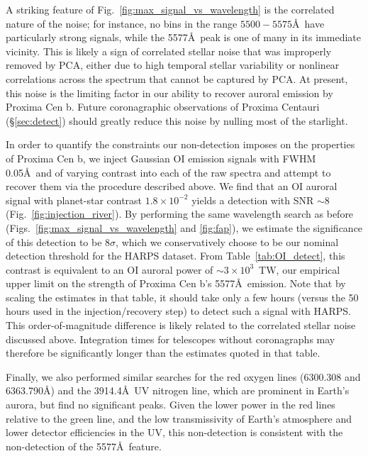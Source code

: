 \documentclass{emulateapj}
\begin{document}
A striking feature of Fig.~\ref{fig:max_signal_vs_wavelength} is the correlated nature of the noise; for instance, no bins in the range $5500 - 5575$\AA\ have particularly strong signals, while the 5577\AA\ peak is one of many in its immediate vicinity. This is likely a sign of correlated stellar noise that was improperly removed by PCA, either due to high temporal stellar variability or nonlinear correlations across the spectrum that cannot be captured by PCA. At present, this noise is the limiting factor in our ability to recover auroral emission by Proxima Cen b. Future coronagraphic observations of Proxima Centauri (\S\ref{sec:detect}) should greatly reduce this noise by nulling most of the starlight.

In order to quantify the constraints our non-detection imposes on the properties of Proxima Cen b, we inject Gaussian OI emission signals with FWHM 0.05\AA\ and of varying contrast into each of the raw spectra and attempt to recover them via the procedure described above. We find that an OI auroral signal with planet-star contrast $1.8\times 10^{-2}$ yields a detection with SNR ${\sim} 8$ (Fig.~\ref{fig:injection_river}). By performing the same wavelength search as before (Figs.~\ref{fig:max_signal_vs_wavelength} and \ref{fig:fap}), we estimate the significance of this detection to be $8\sigma$, which we conservatively choose to be our nominal detection threshold for the HARPS dataset. From Table~\ref{tab:OI_detect}, this contrast is equivalent to an OI auroral power of ${\sim} 3\times 10^{3}$~TW, our empirical upper limit on the strength of Proxima Cen b's 5577\AA\ emission. Note that by scaling the estimates in that table, it should take only a few hours (versus the 50 hours used in the injection/recovery step) to detect such a signal with HARPS. This order-of-magnitude difference is likely related to the correlated stellar noise discussed above. Integration times for telescopes without coronagraphs may therefore be significantly longer than the estimates quoted in that table.

Finally, we also performed similar searches for the red oxygen lines (6300.308 and 6363.790\AA) and the 3914.4\AA\ UV nitrogen line, which are prominent in Earth's aurora, but find no significant peaks. Given the lower power in the red lines relative to the green line, and the low transmissivity of Earth's atmosphere and lower detector efficiencies in the UV, this non-detection is consistent with the non-detection of the 5577\AA\ feature.
  
\end{document}
